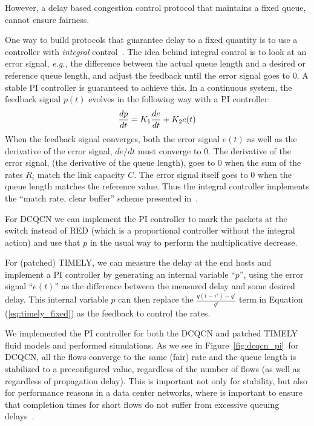 However, a delay based congestion control protocol that maintains a fixed queue,
cannot ensure fairness.

One way to build protocols that guarantee delay to a fixed quantity is to use
a controller with \emph{integral} control~\cite{hollot2001designing,REM}.  The idea behind integral control
is to look at an error signal, {\em e.g.,} the difference between the actual queue
length and a desired or reference queue length, and adjust the feedback until
the error signal goes to 0. A stable PI controller is guaranteed to achieve
this. In a continuous system, the feedback signal $p(t)$ evolves in the
following way with a PI controller:
\begin{equation}
\small
\frac{dp}{dt} = K_1 \frac{de}{dt}+K_2e(t)
\end{equation}
When the feedback signal converges, both the error signal $e(t)$ as
well as the derivative of the error signal, $de/dt$ must converge to
0. The derivative of the error signal, (the derivative of the queue length), goes to 0
when the sum of the rates $R_i$ match the link capacity $C$. The error signal itself goes to 0
when the queue length matches the reference value. Thus the integral
controller implements the ``match rate, clear buffer'' scheme
presented in~\cite{REM}. 

For DCQCN we can implement the PI controller to mark the packets at the switch
instead of RED (which is a proportional controller without the integral action)
and use that $p$ in the usual way to perform the multiplicative decrease. 

For (patched) TIMELY, we can measure the delay at the end hosts and implement a
PI controller by generating an internal variable ``$p$'', using the error signal
``$e(t)$'' as the difference between the measured delay and some
desired delay. This internal variable $p$ can then replace the $\tfrac{{q(t -
\tau ') - q'}}{{q'}}$ term in Equation (\ref{eq:timely_fixed}) as the feedback
to control the rates.

We implemented the PI controller for both the DCQCN and patched TIMELY fluid
models and performed simulations. As we see in Figure~\ref{fig:dcqcn_pi}~for
DCQCN, all the flows converge to the same (fair) rate and the queue length is stabilized to a preconfigured value, regardless of
the number of flows (as well as regardless of propagation delay). This is
important not only for stability, but also for performance reasons in a data
center networks, where is important to ensure that completion times for short
flows do not suffer from excessive queuing delays~\cite{dctcp}.

